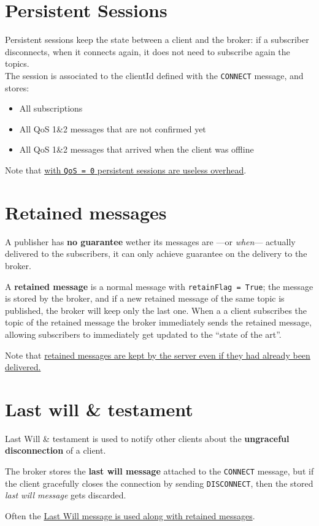 \section{Persistent Sessions}
Persistent sessions keep the state between a client and the broker:
if a subscriber disconnects, when it connects again, it does not need to subscribe again the topics.\\
The session is associated to the clientId defined with the \texttt{CONNECT} message, and stores:
\begin{itemize}
   \item All subscriptions
   \item All QoS 1\&2 messages that are not confirmed yet
   \item All QoS 1\&2 messages that arrived when the client was
   offline
\end{itemize}

Note that \ul{with \texttt{QoS = 0} persistent sessions are useless overhead}.

\section{Retained messages}
A publisher has \textbf{no guarantee} wether its messages are ---or \textit{when}---
actually delivered to the subscribers,
it can only achieve guarantee on the delivery to the broker.

A \textbf{retained message} is a normal message with
\texttt{retainFlag = True}; the message is stored by the broker, and if a new retained message of the same topic is published, the broker will keep only the last one.
When a a client subscribes the topic of the retained
message  the broker immediately sends the retained message,
allowing subscribers to immediately get updated to the ``state of the art''.

Note that \ul{retained messages are kept by the server even if they had already been delivered.}

\section{Last will \& testament}
Last Will \& testament is used to notify other clients about the \textbf{ungraceful disconnection} of a client.

The broker stores the \textbf{last will message} attached to the \texttt{CONNECT} message, but if the client gracefully closes the connection by sending \texttt{DISCONNECT}, then the stored \textit{last will message} gets discarded.

Often the \ul{Last Will message is used along with retained messages}.
